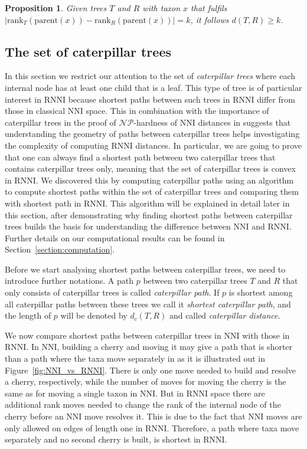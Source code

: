 \documentclass{amsart}
\newcommand{\np}{\mathcal{NP}}
\newcommand{\parent}{\mathrm{parent}}
\newcommand{\rank}{\mathrm{rank}}
\newcommand{\nni}{\mathrm{NNI}}
\newcommand{\rnni}{\mathrm{RNNI}}
\newtheorem{proposition}[definition]{Proposition}
\begin{document}
\begin{proposition}
    Given trees $T$ and $R$ with taxon $x$ that fulfils $|\rank_T(\parent(x)) - \rank_R(\parent(x))| = k$, it follows $d(T,R) \geq k$.
    \label{proposition:lower_bound_distance}
\end{proposition}

\subsection{The set of caterpillar trees}
\label{section:caterpillar_convex}

In this section we restrict our attention to the set of \emph{caterpillar trees} where each internal node has at least one child that is a leaf.
This type of tree is of particular interest in $\rnni$ because shortest paths between such trees in $\rnni$ differ from those in classical $\nni$ space.
This in combination with the importance of caterpillar trees in the proof of $\np$-hardness of $\nni$ distances in \autocite{Dasgupta2000-xa} suggests that understanding the geometry of paths between caterpillar trees helps investigating the complexity of computing $\rnni$ distances.
In particular, we are going to prove that one can always find a shortest path between two caterpillar trees that contains caterpillar trees only, meaning that the set of caterpillar trees is convex in $\rnni$.
We discovered this by computing caterpillar paths using an algorithm to compute shortest paths within the set of caterpillar trees and comparing them with shortest path in $\rnni$.
This algorithm will be explained in detail later in this section, after demonstrating why finding shortest paths between caterpillar trees builds the basis for understanding the difference between $\nni$ and $\rnni$.
Further details on our computational results can be found in Section~\ref{section:computation}.

Before we start analysing shortest paths between caterpillar trees, we need to introduce further notations.
A path $p$ between two caterpillar trees $T$ and $R$ that only consists of caterpillar trees is called \emph{caterpillar path}.
If $p$ is shortest among all caterpillar paths between these trees we call it \emph{shortest caterpillar path}, and the length of $p$ will be denoted by $d_c(T,R)$ and called \emph{caterpillar distance}.

We now compare shortest paths between caterpillar trees in $\nni$ with those in $\rnni$.
In $\nni$, building a cherry and moving it may give a path that is shorter than a path where the taxa move separately in as it is illustrated out in Figure~\ref{fig:NNI_vs_RNNI}.
There is only one move needed to build and resolve a cherry, respectively, while the number of moves for moving the cherry is the same as for moving a single taxon in $\nni$.
But in $\rnni$ space there are additional rank moves needed to change the rank of the internal node of the cherry before an $\nni$ move resolves it.
This is due to the fact that $\nni$ moves are only allowed on edges of length one in $\rnni$.
Therefore, a path where taxa move separately and no second cherry is built, is shortest in $\rnni$.
\end{document}
